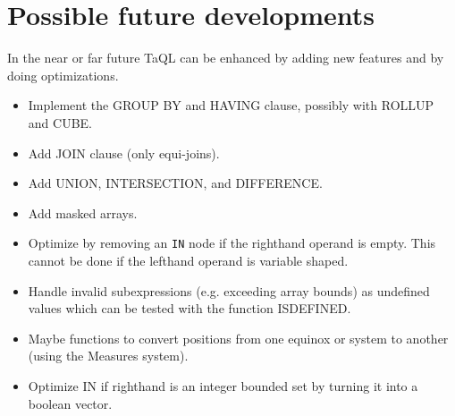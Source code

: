 \section{Possible future developments}
In the near or far future TaQL can be enhanced by adding new
features and by doing optimizations.
\begin{itemize}
  \item Implement the GROUP BY and  HAVING clause, possibly with
    ROLLUP and CUBE.
  \item Add JOIN clause (only equi-joins).
  \item Add UNION, INTERSECTION, and DIFFERENCE.
  \item Add masked arrays.
  \item Optimize by removing an \texttt{IN} node if the righthand
    operand is empty. This cannot be done if the lefthand operand
    is variable shaped.
  \item Handle invalid subexpressions (e.g. exceeding array bounds)
    as undefined values
    which can be tested with the function ISDEFINED.
  \item Maybe functions to convert positions from one equinox or system
    to another (using the Measures system).
  \item Optimize IN if righthand is an integer bounded set by turning
    it into a boolean vector.
\end{itemize}
